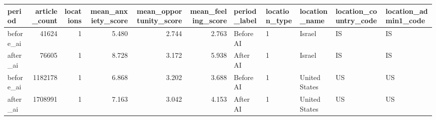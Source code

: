 \begin{tabular}{lrrrrrlllll}
\toprule
period & article\_count & locations & mean\_anxiety\_score & mean\_opportunity\_score & mean\_feeling\_score & period\_label & location\_type & location\_name & location\_country\_code & location\_admin1\_code \\
\midrule
before\_ai & 41624 & 1 & 5.480 & 2.744 & 2.763 & Before AI & 1 & Israel & IS & IS \\
after\_ai & 76605 & 1 & 8.728 & 3.172 & 5.938 & After AI & 1 & Israel & IS & IS \\
before\_ai & 1182178 & 1 & 6.868 & 3.202 & 3.688 & Before AI & 1 & United States & US & US \\
after\_ai & 1708991 & 1 & 7.163 & 3.042 & 4.153 & After AI & 1 & United States & US & US \\
\bottomrule
\end{tabular}
